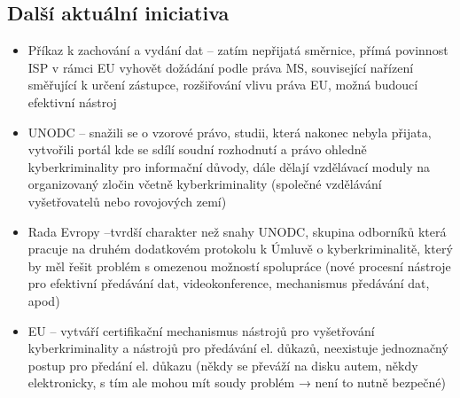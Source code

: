 \subsection{Další aktuální iniciativa}
\begin{itemize}
    \item Příkaz k zachování a vydání dat -- zatím nepřijatá směrnice, přímá povinnost ISP v rámci EU vyhovět dožádání podle práva MS, související nařízení směřující k určení zástupce, rozšiřování vlivu práva EU, možná budoucí efektivní nástroj
    \item UNODC -- snažili se o vzorové právo, studii, která nakonec nebyla přijata, vytvořili portál kde se sdílí soudní rozhodnutí a právo ohledně kyberkriminality pro informační důvody, dále dělají vzdělávací moduly na organizovaný zločin včetně kyberkriminality (společné vzdělávání vyšetřovatelů nebo rovojových zemí)
    \item Rada Evropy --tvrdší charakter než snahy UNODC, skupina odborníků která pracuje na druhém dodatkovém protokolu k Úmluvě o kyberkriminalitě, který by měl řešit problém s omezenou možností spolupráce (nové procesní nástroje pro efektivní předávání dat, videokonference, mechanismus předávání dat, apod)
    \item EU -- vytváří certifikační mechanismus nástrojů pro vyšetřování kyberkriminality a nástrojů pro předávání el. důkazů, neexistuje jednoznačný postup pro předání el. důkazu (někdy se převáží na disku autem, někdy elektronicky, s tím ale mohou mít soudy problém → není to nutně bezpečné)
\end{itemize}
